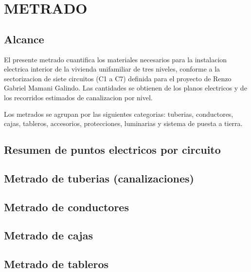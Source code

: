 \chapter{METRADO}

\section{Alcance}

El presente metrado cuantifica los materiales necesarios para la instalacion electrica interior de la vivienda unifamiliar de tres niveles, conforme a la sectorizacion de siete circuitos (C1 a C7) definida para el proyecto de Renzo Gabriel Mamani Galindo. Las cantidades se obtienen de los planos electricos y de los recorridos estimados de canalizacion por nivel.

Los metrados se agrupan por las siguientes categorias: tuberias, conductores, cajas, tableros, accesorios, protecciones, luminarias y sistema de puesta a tierra.

\section{Resumen de puntos electricos por circuito}



\section{Metrado de tuberias (canalizaciones)}



\section{Metrado de conductores}



\clearpage

\section{Metrado de cajas}



\section{Metrado de tableros}


